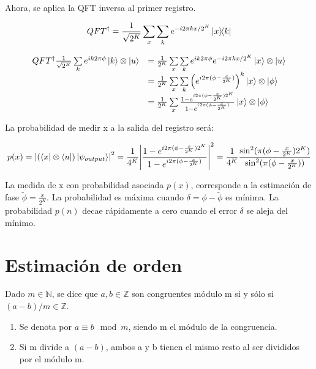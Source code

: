 Ahora, se aplica la QFT inversa al primer registro.

\begin{equation}
    QFT^\dagger = \frac{1}{\sqrt{2^K}} \sum\limits_x\sum\limits_k e^{-i 2\pi k x / 2^K} \ketbra{x}{k}
\end{equation}

\begin{equation}
\begin{array}{r l}
    QFT^\dagger \frac{1}{\sqrt{2^K}} \sum\limits_k e^{i k 2\pi \phi} \ket{k} \otimes \ket{u} &= \frac{1}{2^K} \sum\limits_x \sum\limits_k e^{i k 2\pi \phi} e^{-i 2\pi k x / 2^K} \ket{x} \otimes \ket{u} \\
    &= \frac{1}{2^K} \sum\limits_x\sum\limits_k \left(e^{i 2\pi (\phi - \frac{x}{2^K})}\right)^k \ket{x} \otimes \ket{\phi} \\
    &= \frac{1}{2^K} \sum\limits_x \frac{1 - e^{i 2\pi (\phi - \frac{x}{2^K}) 2^K}}{1 - e^{i 2\pi (\phi - \frac{x}{2^K})}} \ket{x} \otimes \ket{\phi} \\
\end{array}
\end{equation}

La probabilidad de medir x a la salida del registro será:

\begin{equation}
    p(x) = \abs{(\bra{x} \otimes \bra{u}) \ket{\psi_{output}}}^2 = \frac{1}{4^K} \abs{\frac{1 - e^{i 2\pi (\phi - \frac{x}{2^K})2^K}}{1 - e^{i 2\pi (\phi - \frac{x}{2^K})}}}^2 = \frac{1}{4^{K}} \frac{\sin^2(\pi (\phi - \frac{x}{2^K}) 2^K)}{\sin^2(\pi (\phi - \frac{x}{2^K}))}
\end{equation}

La medida de x con probabilidad asociada $p(x)$, corresponde a la estimación de fase $\tilde{\phi} = \frac{x}{2^K}$. La probabilidad es máxima cuando $\delta = \phi - \tilde{\phi}$ es mínima. La probabilidad $p(n)$ decae rápidamente a cero cuando el error $\delta$ se aleja del mínimo.

\section{Estimación de orden}

Dado $m \in \mathds{N}$, se dice que $a,b \in \mathds{Z}$ son congruentes módulo m si y sólo si $(a-b)/m \in \mathds{Z}$.

\begin{enumerate}
    \item Se denota por $a \equiv b \mod m$, siendo m el módulo de la congruencia.
    \item Si m divide a $(a-b)$, ambos a y b tienen el mismo resto al ser divididos por el módulo m.
\end{enumerate}

